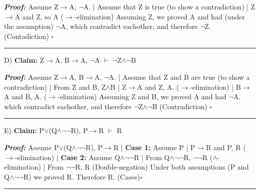 \documentclass{article}
\begin{document}
\textbf{\textit{Proof: }}\newline
Assume Z$\rightarrow$A, $\neg$A.\newline
|	Assume that Z is true (to show a contradiction)\newline
|	Z$\rightarrow$A and Z, so A ($\rightarrow$-elimination)\newline
Assuming Z, we proved A and had (under the assumption) $\neg$A, which contradict eachother, and therefore $\neg$Z. (Contadiction) $\square$\newline\rule{10cm}{1pt}\newline



D) \textbf{Claim: } Z$\rightarrow$A, B$\rightarrow$A, $\neg$A $\vdash$ $\neg$Z$\wedge$$\neg$B\newline

\textbf{\textit{Proof: }}\newline
Assume Z$\rightarrow$A, B$\rightarrow$A, $\neg$A.\newline
|	Assume that Z and B are true (to show a contradiction)\newline
|	From Z and B, Z$\wedge$B
|	Z$\rightarrow$A and Z, A. ($\rightarrow$-elimination)\newline
|	B$\rightarrow$A and B, A. ($\rightarrow$-elimination)\newline
Assuming Z and B, we proved A and had $\neg$A, which contradict eachother, and therefore $\neg$Z$\wedge$$\neg$B (Contradiction) $\square$\newline\rule{10cm}{1pt}\newline



E) \textbf{Claim: } P$\lor$(Q$\wedge$$\neg$$\neg$R), P$\rightarrow$R $\vdash$ R\newline

\textbf{\textit{Proof: }}\newline
Assume P$\lor$(Q$\wedge$$\neg$$\neg$R), P$\rightarrow$R\newline
|	\textbf{Case 1: } Assume P\newline
|	P$\rightarrow$R and P, R ($\rightarrow$-elimination)\newline
|	\textbf{Case 2: } Assume Q$\wedge$$\neg$$\neg$R\newline
|	From Q$\wedge$$\neg$$\neg$R, $\neg$$\neg$R ($\wedge$-elimination)\newline
|	From $\neg$$\neg$R, R (Double-negation)\newline
Under both assumptions (P and Q$\wedge$$\neg$$\neg$R) we proved R. Therefore R. (Cases)$\square$\newline\rule{10cm}{1pt}\newline
\end{document}
